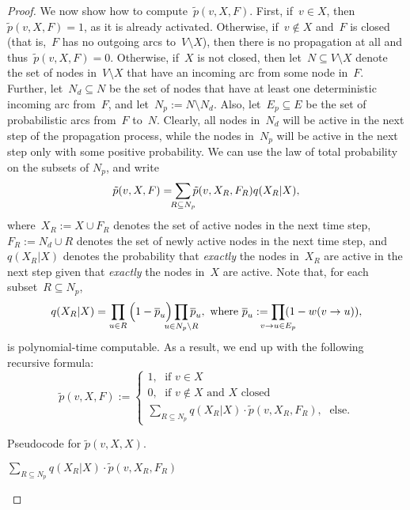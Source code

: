 \documentclass{article}
\begin{document}
\begin{proof}
  We now show how to compute~$\tilde{p}(v,X,F)$.
  First, if~$v\in X$, then $\tilde{p}(v,X,F)=1$, as it is already activated.
  Otherwise, if~$v\not\in X$ and~$F$ is closed (that is,~$F$ has no
  outgoing arcs to~$V\setminus X$),
  then there is no propagation at all and thus~$\tilde{p}(v,X,F)=0$.
  Otherwise, if~$X$ is not closed, then let~$N\subseteq V\setminus X$ denote
  the set of nodes in~$V\setminus X$ that have an
  incoming arc from some node in~$F$.
  Further, let~$N_d\subseteq N$ be the set of nodes that
  have at least one deterministic incoming arc from~$F$, and
  let~$N_p:=N\setminus N_d$.
  Also, let~$E_p\subseteq E$ be the set of probabilistic arcs from~$F$ to~$N$.
  Clearly, all nodes in~$N_d$ will be active in the next step of the
  propagation process, while the nodes in~$N_p$ will be active in the
  next step only with some positive probability.
  We can use the law of total probability on the subsets of $N_p$,
  and write
  \[\tilde{p}(v,X,F)=\smashoperator{\sum_{R\subseteq N_p}}\tilde{p}(v,X_R,F_R)q(X_R|X),\]
  where~$X_R:=X\cup F_R$ denotes the set of active nodes in the next time step,
  $F_R:=N_d\cup R$ denotes the set of newly active nodes in the next time step,
  and~$q(X_R|X)$ denotes the probability that \emph{exactly} the nodes
  in~$X_R$ are active in the next step given that \emph{exactly} the nodes
  in~$X$ are active.
  Note that, for each subset~$R\subseteq N_p$,
  \[q(X_R|X) = \prod_{u\in R}\Big(1-\overline{p}_u\Big)\smashoperator{\prod_{u\in N_p \setminus R}}\overline{p}_u,
  \text{  where  } \overline{p}_u:=\smashoperator{\prod_{v\to u\in E_p}}(1-w(v\to u)),\]
  is polynomial-time computable.
  As a result,
  we end up with the following recursive formula:
  \[\tilde{p}(v,X,F) :=
  \begin{cases}
    1,\; \text{ if }v\in X\\
    0,\; \text{ if }v\not\in X \text{ and } X \text{ closed}\\
    \sum_{R\subseteq N_p}q(X_R|X)\cdot \tilde{p}(v,X_R,F_R),\; \text{ else}.
  \end{cases}\]
  
  \begin{algorithm}[t]
    \normalsize
    \SetAlgoNoLine
    \caption{Pseudocode for $\tilde{p}(v, X, X)$.}
    \label{alg:costFPTr}
    \Return $\sum_{R\subseteq N_p}q(X_R|X)\cdot \tilde{p}(v,X_R,F_R)$
  \end{algorithm}
  

\end{proof}
\end{document}
